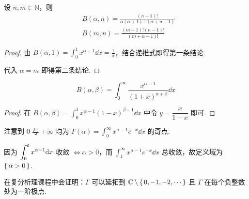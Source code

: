 \begin{inference}
    设 $n,m\in\mathbb{N}$，则
$$
\begin{aligned}
    &B(\alpha,n)=\frac{(n-1)!}{\alpha(\alpha+1)\cdots(\alpha+n-1)}\\
    &B(m,n)=\frac{(m-1)!(n-1)!}{(m+n-1)!}
\end{aligned}
$$
\end{inference}
\begin{proof}
    由 $B(\alpha,1)=\displaystyle\int_0^1x^{\alpha-1}\dd x=\frac{1}{\alpha}$，结合递推式即得第一条结论.

    代入 $\alpha=m$ 即得第二条结论.
\end{proof}


\begin{property}
$$
B(\alpha,\beta)=\int_0^\infty\frac{x^{\alpha-1}}{(1+x)^{\alpha+\beta}}\dd x
$$
\end{property}
\begin{proof}
    在 $B(\alpha,\beta)=\displaystyle\int_0^1x^{\alpha-1}(1-x)^{\beta-1}\dd x$ 中令 $y=\dfrac{x}{1-x}$ 即可.
\end{proof}



注意到 $0$ 与 $+\infty$ 均为 $\Gamma(\alpha)=\displaystyle\int_0^\infty x^{\alpha-1}e^{-x}\dd x$ 的奇点.

因为 $\displaystyle\int_0^\varepsilon x^{\alpha-1}\mathrm{d} x$ 收敛 $\iff\alpha>0$，而 $\displaystyle\int_1^\infty x^{\alpha-1}e^{-x}\dd x$ 总收敛，故定义域为 $\set{\alpha>0}$.

\begin{hint}
    在复分析理课程中会证明：$\Gamma$ 可以延拓到 $\mathbb{C}\setminus\set{0,-1,-2,\cdots}$ 且 $\Gamma$ 在每个负整数处为一阶极点.
\end{hint}


